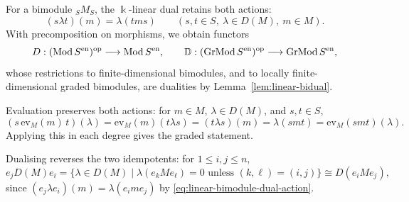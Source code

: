 For a bimodule ${}_SM_S$, the $\Bbbk$-linear dual retains both actions:
\begin{equation}\label{eq:linear-bimodule-dual-action}
(s\lambda t)(m)=\lambda(tms)\qquad(s,t\in S,\ \lambda\in D(M),\ m\in M).
\end{equation}
With precomposition on morphisms, we obtain functors
\[
D:(\operatorname{\mathrm{Mod}} S^{\mathrm{en}})^{\mathrm{op}}\longrightarrow\operatorname{\mathrm{Mod}} S^{\mathrm{en}},\qquad
\mathbb{D}:(\operatorname{\mathrm{GrMod}} S^{\mathrm{en}})^{\mathrm{op}}\longrightarrow\operatorname{\mathrm{GrMod}} S^{\mathrm{en}},
\]
whose restrictions to finite-dimensional bimodules, and to locally finite-dimensional graded bimodules, are dualities by Lemma~\ref{lem:linear-bidual}.
\begin{supplementary}
Evaluation preserves both actions: for $m\in M$, $\lambda\in D(M)$, and $s,t\in S$,
\[
(s\,\mathrm{ev}_M(m)\,t)(\lambda)=\mathrm{ev}_M(m)(t\lambda s)=(t\lambda s)(m)=\lambda(smt)=\mathrm{ev}_M(smt)(\lambda).
\]
Applying this in each degree gives the graded statement.
\end{supplementary}

Dualising reverses the two idempotents: for $1\leq i,j\leq n$,
\begin{equation}\label{eq:dual-blocks}
e_jD(M)e_i=\{\lambda\in D(M)\mid\lambda(e_kMe_\ell)=0\text{ unless }(k,\ell)=(i,j)\}\cong D(e_iMe_j),
\end{equation}
since $(e_j\lambda e_i)(m)=\lambda(e_ime_j)$ by \eqref{eq:linear-bimodule-dual-action}.


